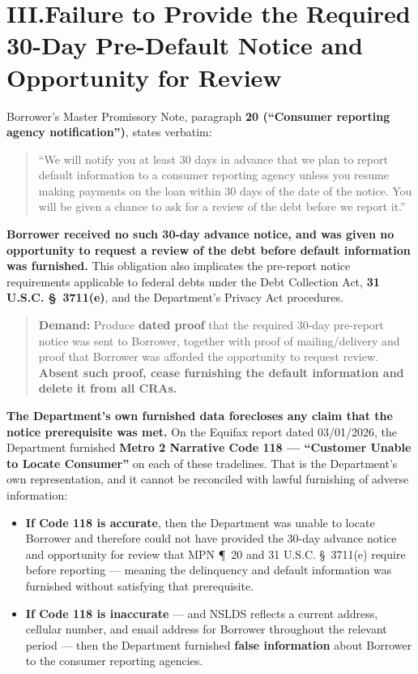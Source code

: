 \documentclass[11pt]{article}
\newcommand{\demand}[1]{\begin{quote}\textbf{Demand:} #1\end{quote}}
\begin{document}
\section*{III.\quad Failure to Provide the Required 30-Day Pre-Default Notice and Opportunity for Review}

Borrower's Master Promissory Note, paragraph \textbf{20 (``Consumer reporting agency notification'')}, states verbatim:

\begin{quote}
``We will notify you at least 30 days in advance that we plan to report default information to a consumer reporting agency unless you resume making payments on the loan within 30 days of the date of the notice. You will be given a chance to ask for a review of the debt before we report it.''
\end{quote}

\noindent \textbf{Borrower received no such 30-day advance notice, and was given no opportunity to request a review of the debt before default information was furnished.} This obligation also implicates the pre-report notice requirements applicable to federal debts under the Debt Collection Act, \textbf{31 U.S.C. \S~3711(e)}, and the Department's Privacy Act procedures.

\demand{Produce \textbf{dated proof} that the required 30-day pre-report notice was sent to Borrower, together with proof of mailing/delivery and proof that Borrower was afforded the opportunity to request review. \textbf{Absent such proof, cease furnishing the default information and delete it from all CRAs.}}

\noindent \textbf{The Department's own furnished data forecloses any claim that the notice prerequisite was met.} On the Equifax report dated 03/01/2026, the Department furnished \textbf{Metro 2 Narrative Code 118 --- ``Customer Unable to Locate Consumer''} on each of these tradelines. That is the Department's own representation, and it cannot be reconciled with lawful furnishing of adverse information:

\begin{itemize}
  \item \textbf{If Code 118 is accurate}, then the Department was unable to locate Borrower and therefore could not have provided the 30-day advance notice and opportunity for review that MPN \P~20 and 31 U.S.C. \S~3711(e) require before reporting --- meaning the delinquency and default information was furnished without satisfying that prerequisite.
  \item \textbf{If Code 118 is inaccurate} --- and NSLDS reflects a current address, cellular number, and email address for Borrower throughout the relevant period --- then the Department furnished \textbf{false information} about Borrower to the consumer reporting agencies.
\end{itemize}
\end{document}
